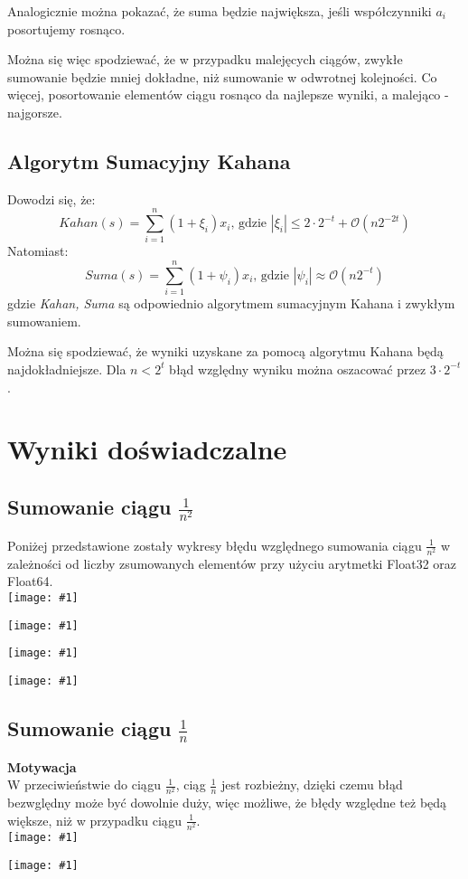 \documentclass{article}
\newcommand{\plot}[1] {
	\texttt{[image: \#1]}
}
\begin{document}
	Analogicznie można pokazać, że suma będzie największa, jeśli współczynniki $a_{i}$ posortujemy rosnąco.
	
	\par Można się więc spodziewać, że w przypadku malejęcych ciągów, zwykłe sumowanie będzie mniej dokładne, niż sumowanie w odwrotnej kolejności. Co więcej, posortowanie elementów ciągu rosnąco da najlepsze wyniki, a malejąco - najgorsze.
	\subsection{Algorytm Sumacyjny Kahana}
		Dowodzi się, że:
		$$ Kahan(s) = \sum\limits_{i=1}^n (1+ \xi_{i})x_{i} \text{, gdzie } 
		|\xi_{i}| \le 2 \cdot 2^{-t} +  \mathcal{O}(n2^{-2t})$$
		Natomiast:
		$$ Suma(s) = \sum\limits_{i=1}^n (1 + \psi_{i})x_{i} \text{, gdzie } 
		|\psi_{i}|  \approx \mathcal{O}(n2^{-t})$$
		gdzie \textit{Kahan, Suma} są odpowiednio algorytmem sumacyjnym Kahana i zwykłym sumowaniem. 
		\par Można się spodziewać, że wyniki uzyskane za pomocą algorytmu Kahana będą najdokładniejsze. Dla $n < 2^t$ błąd względny wyniku można oszacować przez $3 \cdot 2^{-t}$.
	
	\section{Wyniki doświadczalne}
	\subsection{Sumowanie ciągu $\frac{1}{n^2}$}
	Poniżej przedstawione zostały wykresy błędu względnego sumowania ciągu $\frac{1}{n^2}$ w zależności od liczby zsumowanych elementów przy użyciu arytmetki Float32 oraz Float64. \\
	\plot{flsmallsquareone.png}
	\plot{flsmallsquaretwo.png}
	\plot{flbigsquareone.png}
	\plot{flbigsquarethree.png}
	\subsection{Sumowanie ciągu $\frac{1}{n}$}
	\textbf{Motywacja} \\
	W przeciwieństwie do ciągu $\frac{1}{n^2}$, ciąg $\frac{1}{n}$ jest rozbieżny, dzięki czemu błąd bezwględny może być dowolnie duży, więc możliwe, że błędy względne też będą większe, niż w przypadku ciągu $\frac{1}{n^2}$. \\
	\plot{flsmalllinone.png}
	\plot{flsmalllintwo.png}
\end{document}

